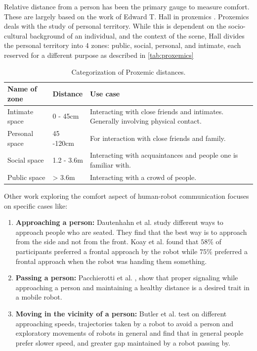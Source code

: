  Relative distance from a person has been the primary gauge to measure comfort. These are largely based on the work of Edward T. Hall in proxemics \cite{proxemics_hall_1968}. Proxemics deals with the study of personal territory. While this is dependent on the socio-cultural background of an individual, and the context of the scene, Hall divides the personal territory into 4 zones: public, social, personal, and intimate, each reserved for a different purpose as described in \autoref{tab:proxemics}
\begin{table}
    \begin{center}
        \renewcommand{\arraystretch}{1.3}
        \begin{tabular}{|p{}|p{}|p{}|}
            \hline
            Name of zone & Distance & Use case \\
            \hline\hline
            Intimate space & 0 - 45cm &  Interacting with close friends and intimates. Generally involving physical contact.\\
            Personal space & 45 -120cm &  For interaction with close friends and family. \\
            Social space & 1.2 - 3.6m &  Interacting with acquaintances and people one is familiar with.\\
            Public space & > 3.6m &  Interacting with a crowd of people.\\
            \hline
        \end{tabular}
        \caption{Categorization of Proxemic distances.}
        \label{tab:proxemics}
    \end{center}
\end{table}
Other work exploring the comfort aspect of human-robot communication focuses on specific cases like:
\begin{enumerate}
    \item \textbf{Approaching a person:} Dautenhahn et al. \cite{dautenhahn_2006}  study different ways to approach people who are seated. They find that the best way is to approach from the side and not from the front.
    Koay et al. \cite{koay2007ExploratorySO}  found that $58\%$ of participants preferred a frontal approach by the robot while $75\%$ preferred a frontal approach when the robot was handing them something.
    \item \textbf{Passing a person:} Pacchierotti et al. \cite{pacchierotti_2006} \cite{pacchierotti_2005},  show that proper signaling while approaching a person and maintaining a healthy distance is a desired trait in a mobile robot.
    \item \textbf{Moving in the vicinity of a person:}  Butler et al. \cite{butler_2001} test on different approaching speeds, trajectories taken by a robot to avoid a person and exploratory movements of robots in general and find that in general people prefer slower speed, and greater gap maintained by a robot passing by.
\end{enumerate}

